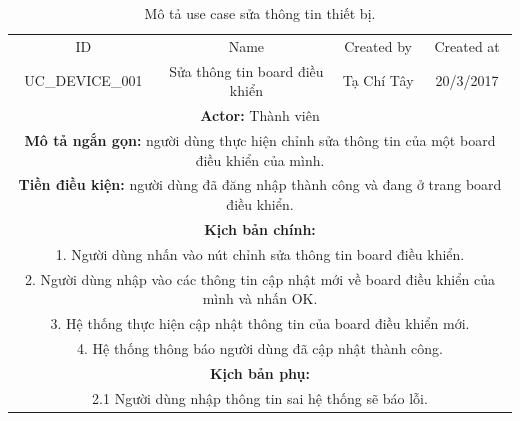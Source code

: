 \documentclass[a4paper,12pt,oneside]{article}
\begin{document}
\begin{table}[!htp]
\centering
\begin{tabularx}{\linewidth}{ |c||c|c|c| }
\hline
ID & Name & Created by & Created at\\
UC\_DEVICE\_001 & Sửa thông tin board điều khiển & Tạ Chí Tây & 20/3/2017\\
\hline
\multicolumn{4}{|X|}{\textbf{Actor:} Thành viên }\\
\hline
\multicolumn{4}{|X|}{\textbf{Mô tả ngắn gọn:} người dùng thực hiện chỉnh sửa thông tin của một board điều khiển của mình. }\\
\hline
\multicolumn{4}{|X|}{\textbf{Tiền điều kiện:} người dùng đã đăng nhập thành công và đang ở trang board điều khiển.}\\
\hline
\multicolumn{4}{|X|}{\textbf{Kịch bản chính:}}\\
\multicolumn{4}{|X|}{1. Người dùng nhấn vào nút chỉnh sửa thông tin board điều khiển.}\\
\multicolumn{4}{|X|}{ 
2.	Người dùng nhập vào các thông tin cập nhật mới về board điều khiển của mình và nhấn OK.}\\
\multicolumn{4}{|X|}{
3.	Hệ thống thực hiện cập nhật thông tin của board điều khiển mới.}\\

\multicolumn{4}{|X|}{4. Hệ thống thông báo người dùng đã cập nhật thành công.}\\
\hline
\multicolumn{4}{|X|}{\textbf{Kịch bản phụ:}}\\
\multicolumn{4}{|X|}{2.1    Người dùng nhập thông tin sai hệ thống sẽ báo lỗi.}\\
\hline

\end{tabularx}
\caption{Mô tả use case sửa thông tin thiết bị.}
\end{table}
\end{document}
